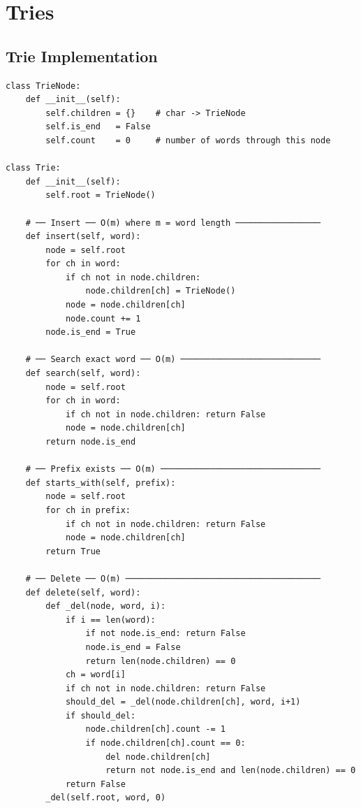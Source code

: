 \documentclass[11pt,a4paper]{report}
\begin{document}
\chapter{Tries}

\section{Trie Implementation}

\begin{lstlisting}
class TrieNode:
    def __init__(self):
        self.children = {}    # char -> TrieNode
        self.is_end   = False
        self.count    = 0     # number of words through this node

class Trie:
    def __init__(self):
        self.root = TrieNode()

    # ── Insert ── O(m) where m = word length ─────────────────
    def insert(self, word):
        node = self.root
        for ch in word:
            if ch not in node.children:
                node.children[ch] = TrieNode()
            node = node.children[ch]
            node.count += 1
        node.is_end = True

    # ── Search exact word ── O(m) ────────────────────────────
    def search(self, word):
        node = self.root
        for ch in word:
            if ch not in node.children: return False
            node = node.children[ch]
        return node.is_end

    # ── Prefix exists ── O(m) ────────────────────────────────
    def starts_with(self, prefix):
        node = self.root
        for ch in prefix:
            if ch not in node.children: return False
            node = node.children[ch]
        return True

    # ── Delete ── O(m) ───────────────────────────────────────
    def delete(self, word):
        def _del(node, word, i):
            if i == len(word):
                if not node.is_end: return False
                node.is_end = False
                return len(node.children) == 0
            ch = word[i]
            if ch not in node.children: return False
            should_del = _del(node.children[ch], word, i+1)
            if should_del:
                node.children[ch].count -= 1
                if node.children[ch].count == 0:
                    del node.children[ch]
                    return not node.is_end and len(node.children) == 0
            return False
        _del(self.root, word, 0)


\end{lstlisting}
\end{document}
